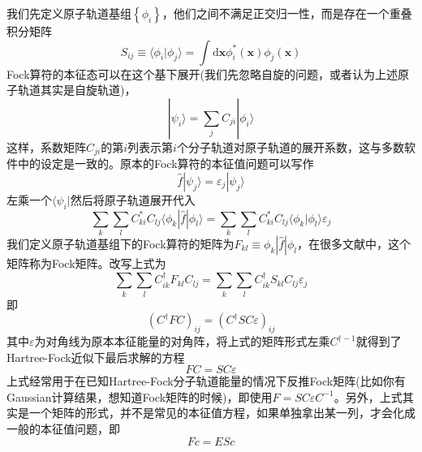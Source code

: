\documentclass[12pt,a4paper,openany,twoside]{article}
\numberwithin{equation}{section}
\begin{document}
                我们先定义原子轨道基组$\left\{\phi_i\right\}$，他们之间不满足正交归一性，而是存在一个重叠积分矩阵
                \begin{equation}
                    {S}_{ij} \equiv \langle \phi_i|\phi_j\rangle = \int \mathrm{d} \boldsymbol{x} \phi_i^*(\boldsymbol{x})\phi_j(\boldsymbol{x})
                \end{equation}
                Fock算符的本征态可以在这个基下展开(我们先忽略自旋的问题，或者认为上述原子轨道其实是自旋轨道)，
                \begin{equation}
                    |\psi_i\rangle = \sum_j C_{ji} |\phi_i\rangle
                \end{equation}
                这样，系数矩阵$C_{ji} $的第$i$列表示第$i$个分子轨道对原子轨道的展开系数，这与多数软件中的设定是一致的。原本的Fock算符的本征值问题可以写作
                \begin{equation}
                    \hat{f}|\psi_j\rangle = \varepsilon_j |\psi_j\rangle
                \end{equation}
                左乘一个$\langle \psi_i|$然后将原子轨道展开代入
                \begin{equation}
                    \sum_k\sum_l C_{ki}^* C_{lj} \langle \phi_k|\hat{f}|\phi_l\rangle = \sum_k\sum_l C_{ki}^* C_{lj} \langle \phi_k|\phi_l\rangle \varepsilon_j 
                \end{equation}
                我们定义原子轨道基组下的Fock算符的矩阵为$F_{kl} \equiv \phi_k|\hat{f}|\phi_l$，在很多文献中，这个矩阵称为Fock矩阵。改写上式为
                \begin{equation}
                    \sum_k\sum_l C_{ik}^{\dagger} F_{kl} C_{lj} = \sum_k\sum_l  C_{ik}^{\dagger} S_{kl} C_{lj}\varepsilon_j 
                \end{equation}
                即
                \begin{equation}
                    \left( C^{\dagger}FC \right)_{ij} = \left( C^{\dagger}SC \varepsilon\right)_{ij}
                \end{equation}
                其中$\varepsilon$为对角线为原本本征能量的对角阵，将上式的矩阵形式左乘$ C^{\dagger -1}$就得到了Hartree-Fock近似下最后求解的方程
                \begin{equation}
                    FC = SC \varepsilon
                    \label{matrix form of secular equation}
                \end{equation}
                上式经常用于在已知Hartree-Fock分子轨道能量的情况下反推Fock矩阵(比如你有Gaussian计算结果，想知道Fock矩阵的时候)，即使用$F = SC \varepsilon C^{-1}$。另外，上式其实是一个矩阵的形式，并不是常见的本征值方程，如果单独拿出某一列，才会化成一般的本征值问题，即
                \begin{equation}
                    Fc = ESc
                \end{equation}
\end{document}
